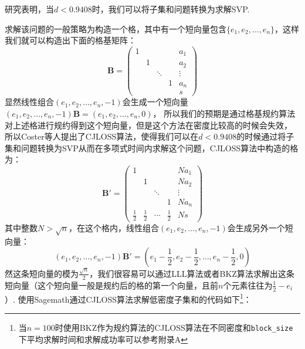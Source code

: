 \documentclass{book}
\numberwithin{equation}{subsubsection}
\begin{document}
研究表明，当$d<0.9408$时，我们可以将子集和问题转换为求解SVP.\par
求解该问题的一般策略为构造一个格，其中有一个短向量包含$\{e_1,e_2,\ldots,e_n\}$，这样我们就可以构造出下面的格基矩阵：
\begin{equation}
    \pmb{B}=\left(\begin{matrix}
    1&&&&a_1\\
    &1&&&a_2\\
    &&\ddots&&\vdots\\
    &&&1&a_n\\
    &&&&s
    \end{matrix}\right)
    \nonumber
\end{equation}
显然线性组合$(e_1,e_2,\ldots,e_n,-1)$会生成一个短向量$(e_1,e_2,\ldots,e_n,-1)\pmb{B}=(e_1,e_2,\ldots,e_n,0)$，
所以我们的预期是通过格基规约算法对上述格进行规约得到这个短向量，但是这个方法在密度比较高的时候会失效，
所以Coster等人提出了CJLOSS算法，使得我们可以在$d<0.9408$的时候通过将子集和问题转换为SVP从而在多项式时间内求解这个问题，CJLOSS算法中构造的格为：
\begin{equation}
    \pmb{B}'=\left(\begin{matrix}
    1&&&&Na_1\\
    &1&&&Na_2\\
    &&\ddots&&\vdots\\
    &&&1&Na_n\\
    \frac{1}{2}&\frac{1}{2}&\cdots&\frac{1}{2}&Ns
    \end{matrix}\right)
    \nonumber
\end{equation}
其中整数$N>\sqrt{n}$，在这个格内，线性组合$(e_1,e_2,\ldots,e_n,-1)$会生成另外一个短向量：
\begin{equation}
    (e_1,e_2,\ldots,e_n,-1)\pmb{B}'=(e_1-\frac{1}{2},e_2-\frac{1}{2},\ldots,e_n-\frac{1}{2},0)
    \nonumber
\end{equation}
然这条短向量的模为$\frac{\sqrt{n}}{2}$，我们很容易可以通过LLL算法或者BKZ算法求解出这条短向量（这个短向量一般是规约后的格的第一个向量，且前$n$个元素往往为$\frac{1}{2}-e_i$）.
使用Sagemath通过CJLOSS算法求解低密度子集和的代码如下\footnote{当$n=100$时使用BKZ作为规约算法的CJLOSS算法在不同密度和\texttt{block\_size}下平均求解时间和求解成功率可以参考附录A}：
\end{document}
